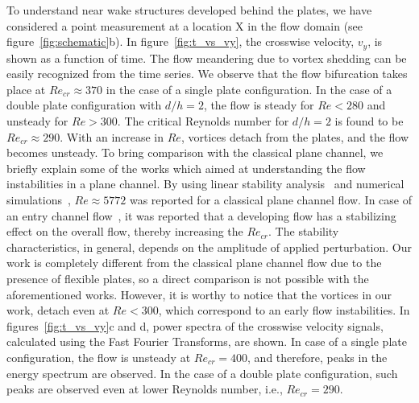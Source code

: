 \documentclass[aps,pre,twocolumn,aps,longbibliography]{revtex4-1}
\begin{document}
	To understand near wake structures developed behind the plates, we have considered a point measurement at a location {\normalsize{X}} in the flow domain (see figure~\ref{fig:schematic}b). In figure~\ref{fig:t_vs_vy}, the crosswise velocity, $v_y$, is shown as a function of time. The flow meandering due to vortex shedding can be easily recognized from the time series. We observe that the flow bifurcation takes place at $Re_{cr}\approx 370$ in the case of a single plate configuration. In the case of a double plate configuration with $d/h=2$, the flow is steady for $Re<280$ and unsteady for $Re>300$. The critical Reynolds number for $d/h=2$ is found to be $Re_{cr}\approx 290$. With an increase in $Re$, vortices detach from the plates, and the flow becomes unsteady. To bring comparison with the classical plane channel, we briefly explain some of the works which aimed at understanding the flow instabilities in a plane channel. By using linear stability analysis~\citep{orszag_1971} and numerical simulations~\citep{orszag_kells_1980}, $Re\approx 5772$ was reported for a classical plane channel flow. In case of an entry channel flow~\citep{Biau2008}, it was reported that a developing flow has a stabilizing effect on the overall flow, thereby increasing the $Re_{cr}$. The stability characteristics, in general, depends on the amplitude of applied perturbation. Our work is completely different from the classical plane channel flow due to the presence of flexible plates, so a direct comparison is not possible with the aforementioned works. However, it is worthy to notice that the vortices in our work, detach even at $Re<300$, which correspond to an early flow instabilities. In figures~\ref{fig:t_vs_vy}c and d, power spectra of the crosswise velocity signals, calculated using the Fast Fourier Transforms, are shown. In case of a single plate configuration, the flow is unsteady at $Re_{cr}=400$, and therefore, peaks in the energy spectrum are observed. In the case of a double plate configuration, such peaks are observed even at lower Reynolds number, i.e., $Re_{cr}=290$.
	
	
	
\end{document}
